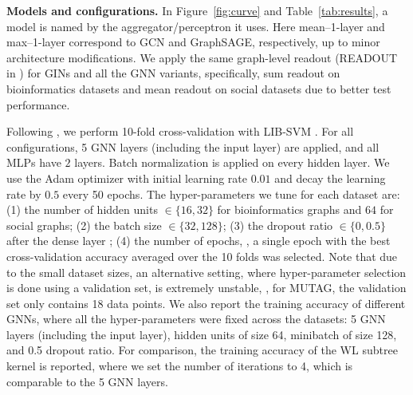 {\bf Models and configurations.} 
In Figure~\ref{fig:curve} and Table~\ref{tab:results}, a model is named by the aggregator/perceptron it uses. Here mean--1-layer and max--1-layer correspond to GCN and GraphSAGE, respectively, up to minor architecture modifications. We apply the same graph-level readout (READOUT in ) for GINs and all the GNN variants, specifically, sum readout on bioinformatics datasets and mean readout on social datasets due to better test performance.

Following \citep{yanardag2015deep, niepert2016learning}, we perform 10-fold cross-validation with LIB-SVM \citep{chang2011libsvm}. 
For all configurations, 5 GNN layers (including the input layer) are applied, and all MLPs have $2$ layers. Batch normalization \citep{ioffe2015batch} is applied on every hidden layer. We use the Adam optimizer \citep{kingma2014adam} with initial learning rate $0.01$ and decay the learning rate by $0.5$ every 50 epochs. The hyper-parameters we tune for each dataset are: (1) the number of hidden units $\in \{16, 32\}$ for bioinformatics graphs and $64$ for social graphs; (2) the batch size $\in \{32, 128\}$; (3) the dropout ratio $\in \{0, 0.5\}$ after the dense layer \citep{srivastava2014dropout}; (4) the number of epochs, \ie, a single epoch with the best cross-validation accuracy averaged over the 10 folds was selected. Note that due to the small dataset sizes, an alternative setting, where hyper-parameter selection is done using a validation set, is extremely unstable, \eg, for MUTAG, the validation set only contains 18 data points.
We also report the training accuracy of different GNNs, where all the hyper-parameters were fixed across the datasets: 5 GNN layers (including the input layer), hidden units of size 64, minibatch of size 128, and 0.5 dropout ratio. For comparison, the training accuracy of the WL subtree kernel is reported, where we set the number of iterations to 4, which is comparable to the 5 GNN layers.


